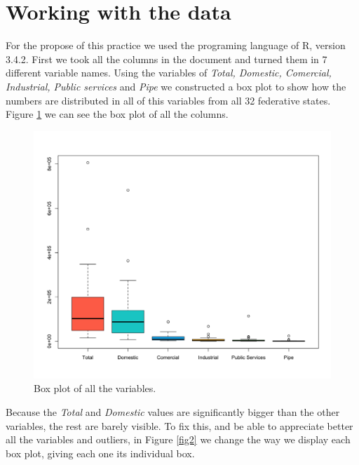 \documentclass{article}
\begin{document}
\section{Working with the data}

For the propose of this practice we used the programing language of R, version 3.4.2. First we took all the columns in the document and turned them in 7 different variable names. Using the variables of \textit{Total, Domestic, Comercial, Industrial, Public services} and \textit{Pipe} we constructed a box plot to show how the numbers are distributed in all of this variables from all 32 federative states. Figure \ref{fig1} we can see the box plot of all the columns.\\

\begin{figure}[htp]
	\centering
	\includegraphics[width=\linewidth]{t1.png}
	\caption{Box plot of all the variables.}\label{fig1}
\end{figure}

\clearpage
 
Because the \textit{Total} and \textit{Domestic} values are significantly bigger than the other variables, the rest are barely visible. To fix this, and be able to appreciate better all the variables and outliers, in Figure \ref{fig2} we change the way we display each box plot, giving each one its individual box.\\
\end{document}
